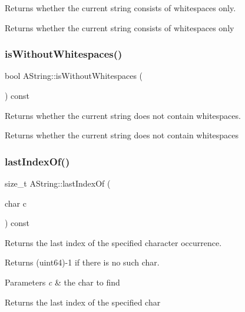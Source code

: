 Returns whether the current string consists of whitespaces only. 

\begin{DoxyReturn}{Returns}
whether the current string consists of whitespaces only 
\end{DoxyReturn}
\mbox{\label{class_a_string_a166108dfe6ceecf9267441715c3a7bce}} 
\subsubsection{\texorpdfstring{isWithoutWhitespaces()}{isWithoutWhitespaces()}}
{\footnotesize\ttfamily bool A\+String\+::is\+Without\+Whitespaces (\begin{DoxyParamCaption}{ }\end{DoxyParamCaption}) const}



Returns whether the current string does not contain whitespaces. 

\begin{DoxyReturn}{Returns}
whether the current string does not contain whitespaces 
\end{DoxyReturn}
\mbox{\label{class_a_string_a11458abb719f576874995cc1a1e06078}} 
\subsubsection{\texorpdfstring{lastIndexOf()}{lastIndexOf()}}
{\footnotesize\ttfamily size\+\_\+t A\+String\+::last\+Index\+Of (\begin{DoxyParamCaption}\item[{char}]{c }\end{DoxyParamCaption}) const}



Returns the last index of the specified character occurrence. 

Returns (uint64)-\/1 if there is no such char.


\begin{DoxyParams}{Parameters}
{\em c} & the char to find \\
\hline
\end{DoxyParams}
\begin{DoxyReturn}{Returns}
the last index of the specified char 
\end{DoxyReturn}
\mbox{\label{class_a_string_a36d25fc88d7f9eccee2b7d0659c19d64}} 
